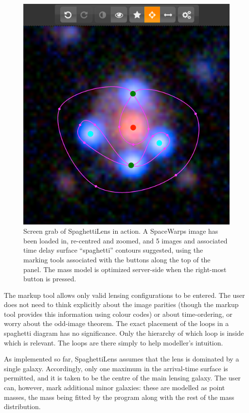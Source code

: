 \documentclass[usenatbib]{mn2e}
\newcommand{\spl}{SpaghettiLens\xspace}
\newcommand{\sw}{SpaceWarps\xspace}
\begin{document}
\begin{figure}
  \centering
    \includegraphics[width=0.90\linewidth]{fig/screenshot}
  \caption{Screen grab of \spl in action. A \sw image has been loaded
    in, re-centred and zoomed, and 5 images and associated time delay
    surface ``spaghetti'' contours suggested, using the marking tools
    associated with the buttons along the top of the panel. The mass
    model is optimized server-side when the right-most button is
    pressed.}
  \label{fig:screenshot}
\end{figure}

The markup tool allows only valid lensing configurations to be
entered.  The user does not need to think explicitly about the image
parities (though the markup tool provides this information using
colour codes) or about time-ordering, or worry about the odd-image
theorem.  The exact placement of the loops in a spaghetti diagram has
no significance.  Only the hierarchy of which loop is inside which is
relevant.  The loops are there simply to help modeller's intuition.

As implemented so far, \spl assumes that the lens is dominated by a
single galaxy.  Accordingly, only one maximum in the arrival-time surface
is permitted, and it is taken to be the centre of the main lensing
galaxy.  The user can, however, mark additional minor galaxies: these
are modelled as point masses, the mass being fitted by the program along
with the rest of the mass distribution.
\end{document}

